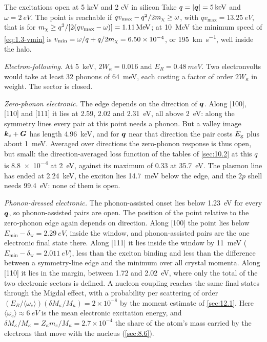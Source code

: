 \begin{workedexample}{The excitations open at 5 keV and 2 eV in silicon}\label{we:9-open}
Take $q = |\bm{q}| = \SI{5}{keV}$ and $\omega = \SI{2}{eV}$. The point is reachable if $qv_{\mathrm{max}} - q^2/2m_{\chi} \ge \omega$, with $qv_{\mathrm{max}} = \SI{13.25}{eV}$, that is for $m_{\chi} \ge q^2/[2(qv_{\mathrm{max}} - \omega)] = \SI{1.11}{MeV}$; at \SI{10}{MeV} the minimum speed of \cref{eq:1.3-vmin} is $v_{\mathrm{min}} = \omega/q + q/2m_{\chi} = 6.50\times10^{-4}$, or \SI{195}{km.s^{-1}}, well inside the halo.

\emph{Electron-following.} At \SI{5}{keV}, $2W_\kappa = 0.016$ and $E_R = \SI{0.48}{meV}$. Two electronvolts would take at least 32 phonons of \SI{64}{meV}, each costing a factor of order $2W_\kappa$ in weight. The sector is closed.

\emph{Zero-phonon electronic.} The edge depends on the direction of $\bm{q}$. Along [100], [110] and [111] it lies at 2.59, 2.02 and \SI{2.31}{eV}, all above \SI{2}{eV}: along the symmetry lines every pair at this point needs a phonon. But a valley image $\bm{k}_{\mathrm{c}} + \bm{G}$ has length \SI{4.96}{keV}, and for $\bm{q}$ near that direction the pair costs $E_{\mathrm{g}}$ plus about \SI{1}{meV}. Averaged over directions the zero-phonon response is thus open, but small: the direction-averaged loss function of the tables of \cref{sec:10.2} at this $q$ is \num{8.8e-4} at \SI{2}{eV}, against its maximum of 0.33 at \SI{35.7}{eV}. The plasmon line has ended at \SI{2.24}{keV}, the exciton lies \SI{14.7}{meV} below the edge, and the $2p$ shell needs \SI{99.4}{eV}: none of them is open.

\emph{Phonon-dressed electronic.} The phonon-assisted onset lies below \SI{1.23}{eV} for every $\bm{q}$, so phonon-assisted pairs are open. The position of the point relative to the zero-phonon edge again depends on direction. Along [100] the point lies below $E_{\mathrm{min}} - \delta_{\mathrm{w}} = \SI{2.29}{eV}$, inside the window, and phonon-assisted pairs are the one electronic final state there. Along [111] it lies inside the window by \SI{11}{meV} ($E_{\mathrm{min}} - \delta_{\mathrm{w}} = \SI{2.011}{eV}$), less than the exciton binding and less than the difference between a symmetry-line edge and the minimum over all crystal momenta. Along [110] it lies in the margin, between 1.72 and \SI{2.02}{eV}, where only the total of the two electronic sectors is defined. A nucleon coupling reaches the same final states through the Migdal effect, with a probability per scattering of order $(E_R/\langle\omega_e\rangle)(\delta M_\kappa/M_\kappa) = 2\times10^{-8}$ by the moment estimate of \cref{sec:12.1}. Here $\langle\omega_e\rangle \approx \SI{6}{eV}$ is the mean electronic excitation energy, and $\delta M_\kappa/M_\kappa = Z_\kappa m_e/M_\kappa = 2.7\times10^{-4}$ the share of the atom's mass carried by the electrons that move with the nucleus (\cref{sec:8.6}).


\end{workedexample}
